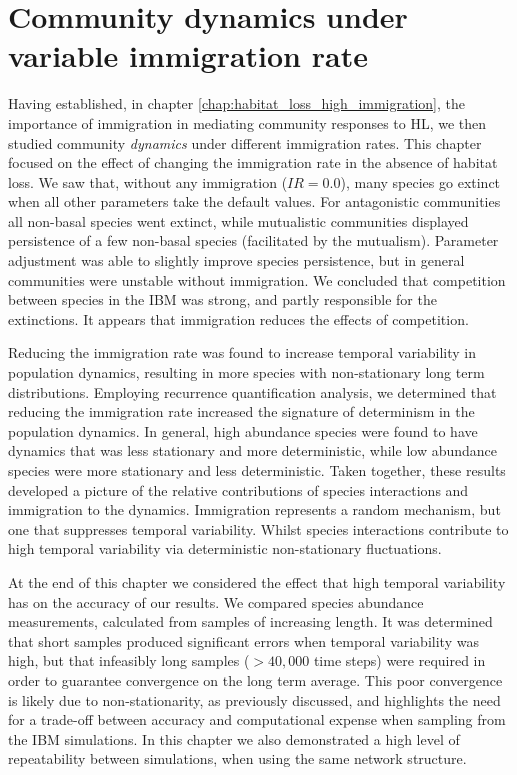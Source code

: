 \section{Community dynamics under variable immigration rate}
\label{sec:com_dyn_var}

Having established, in chapter \ref{chap:habitat_loss_high_immigration}, the importance of immigration in mediating community responses to HL, we then studied community \emph{dynamics} under different immigration rates. This chapter focused on the effect of changing the immigration rate in the absence of habitat loss. We saw that, without any immigration ($IR=0.0$), many species go extinct when all other parameters take the default values. For antagonistic communities all non-basal species went extinct, while mutualistic communities displayed persistence of a few non-basal species (facilitated by the mutualism). Parameter adjustment was able to slightly improve species persistence, but in general communities were unstable without immigration. We concluded that competition between species in the IBM was strong, and partly responsible for the extinctions. It appears that immigration reduces the effects of competition.

Reducing the immigration rate was found to increase temporal variability in population dynamics, resulting in more species with non-stationary long term distributions. Employing recurrence quantification analysis, we determined that reducing the immigration rate increased the signature of determinism in the population dynamics. In general, high abundance species were found to have dynamics that was less stationary and more deterministic, while low abundance species were more stationary and less deterministic. Taken together, these results developed a picture of the relative contributions of species interactions and immigration to the dynamics. Immigration represents a random mechanism, but one that suppresses temporal variability. Whilst species interactions contribute to high temporal variability via deterministic non-stationary fluctuations. 

At the end of this chapter we considered the effect that high temporal variability has on the accuracy of our results. We compared species abundance measurements, calculated from samples of increasing length. It was determined that short samples produced significant errors when temporal variability was high, but that infeasibly long samples ($>40,000$ time steps) were required in order to guarantee convergence on the long term average. This poor convergence is likely due to non-stationarity, as previously discussed, and highlights the need for a trade-off between accuracy and computational expense when sampling from the IBM simulations. In this chapter we also demonstrated a high level of repeatability between simulations, when using the same network structure. 


